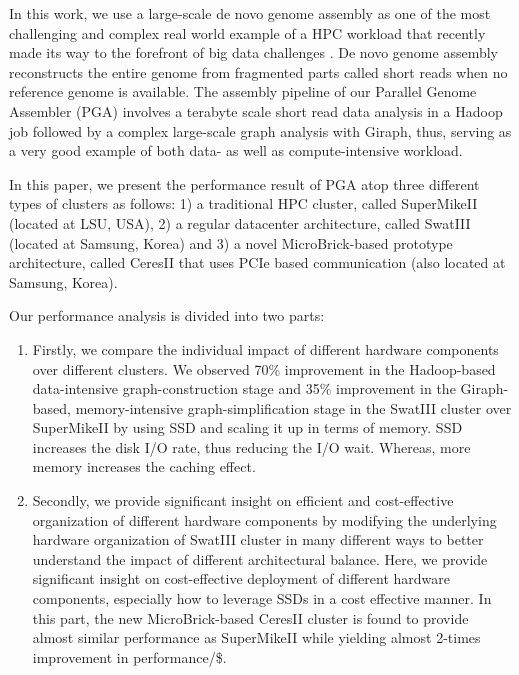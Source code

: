 \documentclass[10pt, conference, compsocconf]{IEEEtran}
\begin{document}
In this work, we use a large-scale de novo genome assembly as one of the most challenging and complex real world example of a HPC workload that recently made its way to the forefront of big data challenges \cite{bigGenome:graphtraverse} \cite{biggenome:kmerpartition}. De novo genome assembly reconstructs the entire genome from fragmented parts called short reads when no reference genome is available. The assembly pipeline of our Parallel Genome Assembler (PGA) involves a terabyte scale short read data analysis in a Hadoop job followed by a complex large-scale graph analysis with Giraph, thus, serving as a very good example of both data- as well as compute-intensive workload.

In this paper, we present the performance result of PGA atop three different types of clusters as follows: 
1) a traditional HPC cluster, called SuperMikeII (located at LSU, USA), 
2) a regular datacenter architecture, called SwatIII (located at Samsung, Korea) and 
3) a novel MicroBrick-based prototype architecture, called CeresII that uses PCIe based communication (also located at Samsung, Korea). 

Our performance analysis is divided into two parts: 
\begin{enumerate}
\item Firstly, we compare the individual impact of different hardware components over different clusters. We observed 70\% improvement in the Hadoop-based data-intensive graph-construction stage and 35\% improvement in the Giraph-based, memory-intensive graph-simplification stage in the SwatIII cluster over SuperMikeII by using SSD and scaling it up in terms of memory. SSD increases the disk I/O rate, thus reducing the I/O wait. Whereas, more memory increases the caching effect. 
\item Secondly, we provide significant insight on efficient and cost-effective organization of different hardware components by modifying the underlying hardware organization of SwatIII cluster in many different ways to better understand the impact of different architectural balance. Here, we provide significant insight on cost-effective deployment of different hardware components, especially how to leverage SSDs in a cost effective manner. 
In this part, the new MicroBrick-based CeresII cluster is found to provide almost similar performance as SuperMikeII while yielding almost 2-times improvement in performance/\$. 
\end{enumerate}
\end{document}
